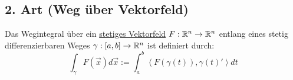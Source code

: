 



\subsection{2. Art (Weg über Vektorfeld)}
Das Wegintegral über ein \underline{stetiges Vektorfeld} $F: \mathbb{R}^n \to \mathbb{R}^n$
entlang eines stetig differenzierbaren Weges $\gamma: [a,b] \to \mathbb{R}^n$ ist definiert
durch:
\[
\int_\gamma F(\vec{x}) d\vec{x} := \int_a^b \left< F(\gamma(t)), \gamma(t)' \right> dt
\]

